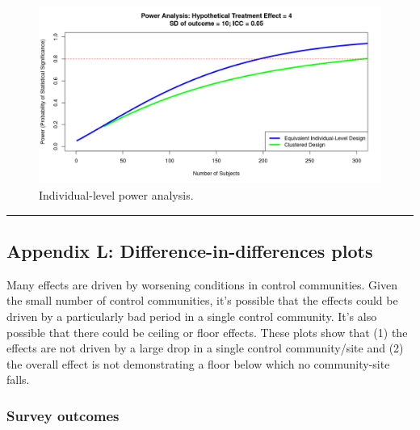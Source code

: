 \documentclass[
]{article}
\begin{document}
\begin{figure}[H]
\centering
\includegraphics[width=\linewidth]{../data_and_code/review/power_figure_ind.png}
\caption{Individual-level power analysis.}\label{fig:pow_ind}
\end{figure}

\begin{center}\rule{0.5\linewidth}{0.5pt}\end{center}

\hypertarget{appendix-l-difference-in-differences-plots}{%
\subsection{Appendix L: Difference-in-differences
plots}\label{appendix-l-difference-in-differences-plots}}

Many effects are driven by worsening conditions in control communities.
Given the small number of control communities, it's possible that the
effects could be driven by a particularly bad period in a single control
community. It's also possible that there could be ceiling or floor
effects. These plots show that (1) the effects are not driven by a large
drop in a single control community/site and (2) the overall effect is
not demonstrating a floor below which no community-site falls.

\hypertarget{survey-outcomes-1}{%
\subsubsection{Survey outcomes}\label{survey-outcomes-1}}
\end{document}
